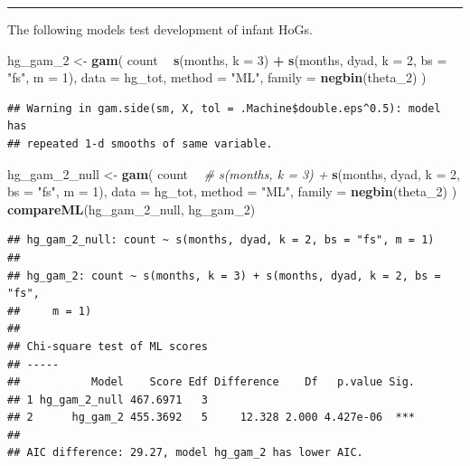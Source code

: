 \documentclass[]{article}
\newenvironment{Shaded}{\begin{snugshade}}{\end{snugshade}}
\newcommand{\CommentTok}[1]{\textcolor[rgb]{0.56,0.35,0.01}{\textit{#1}}}
\newcommand{\DataTypeTok}[1]{\textcolor[rgb]{0.13,0.29,0.53}{#1}}
\newcommand{\DecValTok}[1]{\textcolor[rgb]{0.00,0.00,0.81}{#1}}
\newcommand{\KeywordTok}[1]{\textcolor[rgb]{0.13,0.29,0.53}{\textbf{#1}}}
\newcommand{\NormalTok}[1]{#1}
\newcommand{\OperatorTok}[1]{\textcolor[rgb]{0.81,0.36,0.00}{\textbf{#1}}}
\newcommand{\StringTok}[1]{\textcolor[rgb]{0.31,0.60,0.02}{#1}}
\begin{document}
\begin{center}\rule{0.5\linewidth}{\linethickness}\end{center}

The following models test development of infant HoGs.

\begin{Shaded}
\begin{Highlighting}[]
\NormalTok{hg_gam_}\DecValTok{2}\NormalTok{ <-}\StringTok{ }\KeywordTok{gam}\NormalTok{(}
\NormalTok{  count }\OperatorTok{~}
\StringTok{    }\KeywordTok{s}\NormalTok{(months, }\DataTypeTok{k =} \DecValTok{3}\NormalTok{) }\OperatorTok{+}
\StringTok{    }\KeywordTok{s}\NormalTok{(months, dyad, }\DataTypeTok{k =} \DecValTok{2}\NormalTok{, }\DataTypeTok{bs =} \StringTok{"fs"}\NormalTok{, }\DataTypeTok{m =} \DecValTok{1}\NormalTok{),}
  \DataTypeTok{data =}\NormalTok{ hg_tot,}
  \DataTypeTok{method =} \StringTok{"ML"}\NormalTok{,}
  \DataTypeTok{family =} \KeywordTok{negbin}\NormalTok{(theta_}\DecValTok{2}\NormalTok{)}
\NormalTok{)}
\end{Highlighting}
\end{Shaded}

\begin{verbatim}
## Warning in gam.side(sm, X, tol = .Machine$double.eps^0.5): model has
## repeated 1-d smooths of same variable.
\end{verbatim}

\begin{Shaded}
\begin{Highlighting}[]
\NormalTok{hg_gam_}\DecValTok{2}\NormalTok{_null <-}\StringTok{ }\KeywordTok{gam}\NormalTok{(}
\NormalTok{  count }\OperatorTok{~}
\StringTok{    }\CommentTok{# s(months, k = 3) +}
\StringTok{    }\KeywordTok{s}\NormalTok{(months, dyad, }\DataTypeTok{k =} \DecValTok{2}\NormalTok{, }\DataTypeTok{bs =} \StringTok{"fs"}\NormalTok{, }\DataTypeTok{m =} \DecValTok{1}\NormalTok{),}
  \DataTypeTok{data =}\NormalTok{ hg_tot,}
  \DataTypeTok{method =} \StringTok{"ML"}\NormalTok{,}
  \DataTypeTok{family =} \KeywordTok{negbin}\NormalTok{(theta_}\DecValTok{2}\NormalTok{)}
\NormalTok{)}
\KeywordTok{compareML}\NormalTok{(hg_gam_}\DecValTok{2}\NormalTok{_null, hg_gam_}\DecValTok{2}\NormalTok{)}
\end{Highlighting}
\end{Shaded}

\begin{verbatim}
## hg_gam_2_null: count ~ s(months, dyad, k = 2, bs = "fs", m = 1)
## 
## hg_gam_2: count ~ s(months, k = 3) + s(months, dyad, k = 2, bs = "fs", 
##     m = 1)
## 
## Chi-square test of ML scores
## -----
##           Model    Score Edf Difference    Df   p.value Sig.
## 1 hg_gam_2_null 467.6971   3                                
## 2      hg_gam_2 455.3692   5     12.328 2.000 4.427e-06  ***
## 
## AIC difference: 29.27, model hg_gam_2 has lower AIC.
\end{verbatim}
\end{document}
